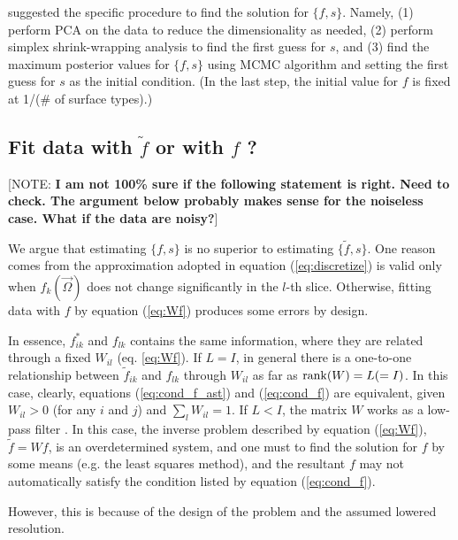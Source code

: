 \documentclass[iop,numberedappendix,apj,]{emulateapj}
\def\fast{\tilde f}
\def\memoYF#1{\color{red}[NOTE: {\bf #1}]\color{black}}
\begin{document}
\citet{Cowan2013} suggested the specific procedure to find the solution for $\{f, s\}$. 
Namely, 
(1) perform PCA on the data to reduce the dimensionality as needed, 
(2) perform simplex shrink-wrapping analysis to find the first guess for $s$, 
and 
(3) find the maximum posterior values for $\{f, s\}$ using MCMC algorithm  and setting the first guess for $s$ as the initial condition. 
(In the last step, the initial value for $f$ is fixed at 1/(\# of surface types).)

\newpage

\subsection{Fit data with $\fast $ or with $f$ ?}
\label{ss:degeneracy}

\memoYF{I am not 100\% sure if the following statement is right. Need to check. The argument below probably makes sense for the noiseless case. What if the data are noisy?}
 
We argue that estimating $\{ f, s \}$ is no superior to estimating $\{ \fast, s \}$. 
%
One reason comes from the approximation adopted in equation (\ref{eq:discretize}) is valid only when $f_k (\vec \Omega)$ does not change significantly in the $l$-th slice. 
Otherwise, fitting data with $f$ by equation (\ref{eq:Wf}) produces some errors by design. 

In essence, $f^{\ast }_{ik}$ and $f_{lk}$ contains the same information, where they are related through a fixed $W_{il}$ (eq. \ref{eq:Wf}). 
%
If $L=I$, in general there is a one-to-one relationship between $\fast_{ik}$ and $f_{lk}$ through $W_{il}$ as far as ${\rm rank}(W)=L(=I)$. 
In this case, clearly, equations (\ref{eq:cond_f_ast}) and (\ref{eq:cond_f}) are equivalent, given $W_{il}>0$ (for any $i$ and $j$) and $\sum _l W_{il} = 1$. 
%
If $L<I$, the matrix $W$ works as a low-pass filter \citep{Cowan2013}. 
In this case, the inverse problem described by equation (\ref{eq:Wf}), $\fast=Wf$, is an overdetermined system, and one must to find the solution for $f$ by some means (e.g. the least squares method), and the resultant $f$ may not automatically satisfy the condition listed by equation (\ref{eq:cond_f}). 

However, this is because of the design of the problem and the assumed lowered resolution. 
\end{document}
